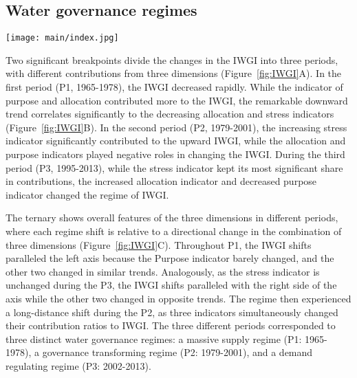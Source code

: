 \subsection{Water governance regimes}
\label{Res.1}

\begin{figure*}[ht!]
	\centering
	\texttt{[image: main/index.jpg]}
	\caption{Changes in the IWGI index.
	\textbf{A,} Change points detection. With significant change points in 1978 and 1994, the IWGI has three different periods.
	\textbf{B,} Contributions of each dimension to the changes of IWGI within each of the three periods. Supply, purpose and allocation were the main positive contributors to P1, P2 and P3.
	\textbf{C,} Combination of contributions across three dimensions in different periods (S: supply; P: purpose; A: allocation).
	The red indicator line in this plot denotes a 1:1 contribution between purpose (P) and allocation (A). When the points are below this line, the contribution ratio of allocation is lower than that of function, and \textit{vice versa}.
	}
	\label{fig:IWGI}
\end{figure*}

Two significant breakpoints divide the changes in the IWGI into three periods, with different contributions from three dimensions (Figure~\ref{fig:IWGI}A).
In the first period (P1, 1965-1978), the IWGI decreased rapidly.
While the indicator of purpose and allocation contributed more to the IWGI, the remarkable downward trend correlates significantly to the decreasing allocation and stress indicators (Figure~\ref{fig:IWGI}B).
In the second period (P2, 1979-2001), the increasing stress indicator significantly contributed to the upward IWGI, while the allocation and purpose indicators played negative roles in changing the IWGI.
During the third period (P3, 1995-2013), while the stress indicator kept its most significant share in contributions, the increased allocation indicator and decreased purpose indicator changed the regime of IWGI.

The ternary shows overall features of the three dimensions in different periods, where each regime shift is relative to a directional change in the combination of three dimensions (Figure~\ref{fig:IWGI}C).
Throughout P1, the IWGI shifts paralleled the left axis because the Purpose indicator barely changed, and the other two changed in similar trends.
Analogously, as the stress indicator is unchanged during the P3, the IWGI shifts paralleled with the right side of the axis while the other two changed in opposite trends.
The regime then experienced a long-distance shift during the P2, as three indicators simultaneously changed their contribution ratios to IWGI.
The three different periods corresponded to three distinct water governance regimes: a massive supply regime (P1: 1965-1978), a governance transforming regime (P2: 1979-2001), and a demand regulating regime (P3: 2002-2013).


